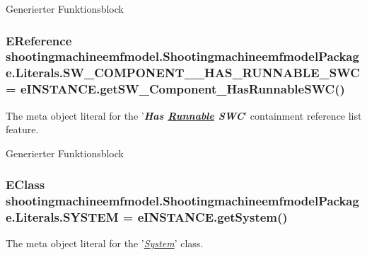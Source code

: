 Generierter Funktionsblock \hypertarget{interfaceshootingmachineemfmodel_1_1_shootingmachineemfmodel_package_1_1_literals_ab335d98bb2bc86424c71161230c1c6ac}{
\subsubsection[{S\-W\-\_\-\-C\-O\-M\-P\-O\-N\-E\-N\-T\-\_\-\-\_\-\-H\-A\-S\-\_\-\-R\-U\-N\-N\-A\-B\-L\-E\-\_\-\-S\-W\-C}]{\setlength{\rightskip}{0pt plus 5cm}E\-Reference shootingmachineemfmodel.\-Shootingmachineemfmodel\-Package.\-Literals.\-S\-W\-\_\-\-C\-O\-M\-P\-O\-N\-E\-N\-T\-\_\-\-\_\-\-H\-A\-S\-\_\-\-R\-U\-N\-N\-A\-B\-L\-E\-\_\-\-S\-W\-C = e\-I\-N\-S\-T\-A\-N\-C\-E.\-get\-S\-W\-\_\-\-Component\-\_\-\-Has\-Runnable\-S\-W\-C()}}\label{interfaceshootingmachineemfmodel_1_1_shootingmachineemfmodel_package_1_1_literals_ab335d98bb2bc86424c71161230c1c6ac}
The meta object literal for the '{\itshape {\bfseries Has \hyperlink{interfaceshootingmachineemfmodel_1_1_runnable}{Runnable} S\-W\-C}}' containment reference list feature.

Generierter Funktionsblock \hypertarget{interfaceshootingmachineemfmodel_1_1_shootingmachineemfmodel_package_1_1_literals_ac93bb8b04721a8beeb74dd13c23318d6}{
\subsubsection[{S\-Y\-S\-T\-E\-M}]{\setlength{\rightskip}{0pt plus 5cm}E\-Class shootingmachineemfmodel.\-Shootingmachineemfmodel\-Package.\-Literals.\-S\-Y\-S\-T\-E\-M = e\-I\-N\-S\-T\-A\-N\-C\-E.\-get\-System()}}\label{interfaceshootingmachineemfmodel_1_1_shootingmachineemfmodel_package_1_1_literals_ac93bb8b04721a8beeb74dd13c23318d6}
The meta object literal for the '\hyperlink{classshootingmachineemfmodel_1_1impl_1_1_system_impl}{{\itshape System}}' class.

